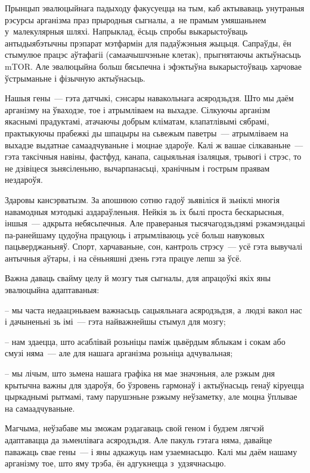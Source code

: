 Прынцып эвалюцыйнага падыходу факусуецца на тым, каб актываваць унутраныя рэсурсы арганізма праз прыродныя сыгналы, а~не прамым умяшаньнем у~малекулярныя шляхі. Напрыклад, ёсьць спробы выкарыстоўваць антыдыябэтычны прэпарат мэтфармін для падаўжэньня жыцьця. Сапраўды, ён стымулюе працэс аўтафагіі (самаачышчэньне клетак), прыгнятаючы актыўнасьць mTOR. Але эвалюцыйна больш бясьпечна і эфэктыўна выкарыстоўваць харчовае ўстрыманьне і фізычную актыўнасьць.

Нашыя гены~--- гэта датчыкі, сэнсары навакольнага асяродзьдзя. Што мы даём арганізму на ўваходзе, тое і атрымліваем на выхадзе. Сілкуючы арганізм якаснымі прадуктамі, атачаючы добрым кліматам, клапатлівымі сябрамі, практыкуючы прабежкі ды шпацыры на сьвежым паветры~--- атрымліваем на выхадзе выдатнае самаадчуваньне і моцнае здароўе. Калі ж вашае сілкаваньне~--- гэта таксічныя навіны, фастфуд, канапа, сацыяльная ізаляцыя, трывогі і стрэс, то не дзівіцеся зьнясіленьню, вычарпанасьці, хранічным і гострым праявам нездароўя.

Здаровы кансэрватызм. За апошнюю сотню гадоў зьявіліся й зьніклі многія навамодныя мэтодыкі аздараўленьня. Нейкія зь іх былі проста бескарысныя, іншыя~--- адкрыта небясьпечныя. Але правераныя тысячагодзьдзямі рэкамэндацыі па-ранейшаму цудоўна працуюць і атрымліваюць усё больш навуковых пацьверджаньняў. Спорт, харчаваньне, сон, кантроль стрэсу~--- усё гэта вывучалі антычныя аўтары, і на сёньняшні дзень гэта працуе лепш за ўсё.

Важна даваць свайму целу й мозгу тыя сыгналы, для апрацоўкі якіх яны эвалюцыйна адаптаваныя: 

– мы часта недаацэньваем важнасьць сацыяльнага асяродзьдзя, а~людзі вакол нас і дачыненьні зь імі~--- гэта найважнейшы стымул для мозгу;

– нам здаецца, што асаблівай розьніцы паміж цьвёрдым яблыкам і сокам або смузі няма~--- але для нашага арганізма розьніца адчувальная;

– мы лічым, што зьмена нашага графіка ня мае значэньня, але рэжым дня крытычна важны для здароўя, бо ўзровень гармонаў і актыўнасьць генаў кіруецца цыркаднымі рытмамі, таму парушэньне рэжыму неўзаметку, але моцна ўплывае на самаадчуваньне.

Магчыма, неўзабаве мы зможам рэдагаваць свой геном і будзем лягчэй адаптавацца да зьменлівага асяродзьдзя. Але пакуль гэтага няма, давайце паважаць свае гены~--- і яны адкажуць нам узаемнасьцю. Калі мы даём нашаму арганізму тое, што яму трэба, ён адгукнецца з~удзячнасьцю.

